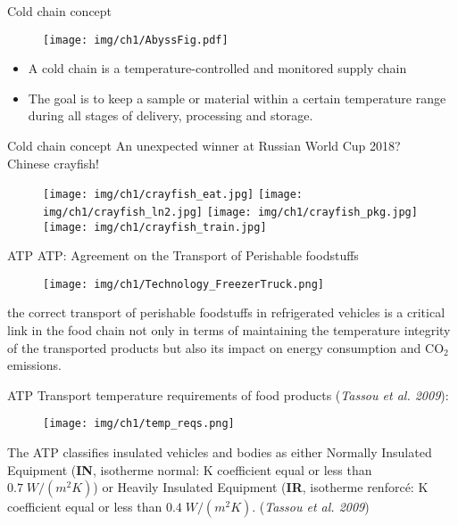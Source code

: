 
\begin{frame}{Cold chain concept}
    \begin{figure}[ht]
        \centering
        \texttt{[image: img/ch1/AbyssFig.pdf]}    
    \end{figure}
    \begin{itemize}
    \item A cold chain is a temperature-controlled and monitored supply chain
    \item The goal is to keep a sample or material within a certain temperature range during all stages of delivery, processing and storage.
    \end{itemize}
\end{frame}


\begin{frame}{Cold chain concept}
An unexpected winner at Russian World Cup 2018? \\
\pause  
\centering
\alert{Chinese crayfish!}
\vspace*{-6pt}
    \begin{figure}[ht]
        \centering
        \texttt{[image: img/ch1/crayfish\_eat.jpg]}
        \pause
        \texttt{[image: img/ch1/crayfish\_ln2.jpg]}
        \pause
        \texttt{[image: img/ch1/crayfish\_pkg.jpg]}
        \pause
        \texttt{[image: img/ch1/crayfish\_train.jpg]}
    \end{figure}

\end{frame}


\begin{frame}{ATP}
    ATP: Agreement on the Transport of Perishable foodstuffs
    \begin{figure}
        \centering
        \texttt{[image: img/ch1/Technology\_FreezerTruck.png]}
    \end{figure}
    \small{the correct transport of perishable foodstuffs in refrigerated vehicles is a critical link in the food chain not only in terms of maintaining the temperature integrity of the transported products but also its impact on energy consumption and CO$_2$ emissions. }
\end{frame}


\begin{frame}{ATP}
\small{Transport temperature requirements of food products (\textit{Tassou et al. 2009}):}
    \begin{figure}
        \centering
        \texttt{[image: img/ch1/temp\_reqs.png]}
    \end{figure}
    \scriptsize{The ATP classifies insulated vehicles and bodies as either Normally Insulated Equipment (\textbf{IN}, isotherme normal: K coefficient equal or less than $ 0.7\; W/(m^2 K) $) or Heavily Insulated Equipment (\textbf{IR}, isotherme renforcé: K coefficient equal or less than $ 0.4\; W/(m^2 K )$. (\textit{Tassou et al. 2009})}
\end{frame}


